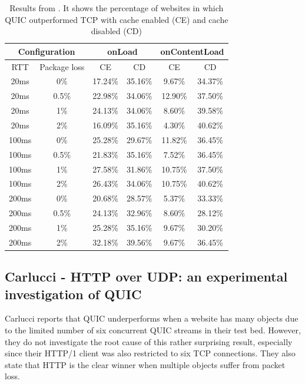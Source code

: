 \documentclass[conference]{IEEEtran}
\begin{document}
\begin{table}
\begin{center}
\begin{tabular}{|cc|cc|cc|}
\hline

\multicolumn{2}{|c|}{\textbf{Configuration}} & 
\multicolumn{2}{|c|}{\textbf{onLoad}} & 
\multicolumn{2}{|c|}{\textbf{onContentLoad}} \\
\hline

RTT & Package loss & CE & CD & CE & CD \\
\hline

20ms  & 0\%   & 17.24\% & 35.16\% & 9.67\%  & 34.37\% \\
20ms  & 0.5\% & 22.98\% & 34.06\% & 12.90\% & 37.50\% \\
20ms  & 1\%   & 24.13\% & 34.06\% & 8.60\%  & 39.58\% \\
20ms  & 2\%   & 16.09\% & 35.16\% & 4.30\%  & 40.62\% \\
100ms & 0\%   & 25.28\% & 29.67\% & 11.82\% & 36.45\% \\
100ms & 0.5\% & 21.83\% & 35.16\% & 7.52\%  & 36.45\% \\
100ms & 1\%   & 27.58\% & 31.86\% & 10.75\% & 37.50\% \\
100ms & 2\%   & 26.43\% & 34.06\% & 10.75\% & 40.62\% \\
200ms & 0\%   & 20.68\% & 28.57\% & 5.37\%  & 33.33\% \\
200ms & 0.5\% & 24.13\% & 32.96\% & 8.60\%  & 28.12\% \\
200ms & 1\%   & 25.28\% & 35.16\% & 9.67\%  & 30.20\% \\
200ms & 2\%   & 32.18\% & 39.56\% & 9.67\%  & 36.45\% \\
\hline

\end{tabular}
\end{center}

\caption{Results from \cite{Nepomuceno}. It shows the percentage of websites in which QUIC outperformed TCP with cache enabled (CE) and cache disabled (CD)}
\label{table:nepomuceno-results}
\end{table}

\subsection{Carlucci - HTTP over UDP: an experimental investigation of QUIC \cite{HTTPoverUDP}}

Carlucci reports that QUIC underperforms when a website has many objects due to the limited number of six concurrent QUIC streams in their test bed. However, they do not investigate the root cause of this rather surprising result, especially since their HTTP/1 client was also restricted to six TCP connections. They also state that HTTP is the clear winner when multiple objects suffer from packet loss.
\end{document}
